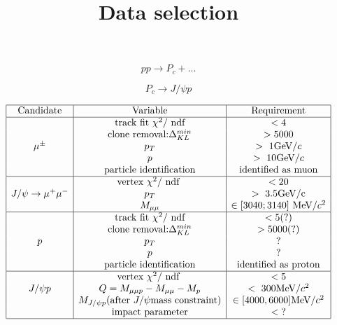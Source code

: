 \documentclass[11pt, oneside]{article}   	%
\title{Data selection}
\author{ }
\begin{document}
\maketitle
$$
pp\rightarrow P_c +...
$$

$$
P_c\rightarrow J/\psi p
$$



$$
\begin{array}{|c|c|c|}
\hline 

\text{Candidate} & \text{Variable} & \text{Requirement} \\

\hline

{} & {\text { track fit } \chi^{2} / \text { ndf }} & {<4} \\
{} & {\text{clone removal:} \Delta_{KL}^{min}} & {>5000} \\
{\mu^{\pm}} & p_T & >\text{ 1GeV}/c \\
{} & p & >\text{ 10GeV}/c \\
{} & {\text{particle identification}} & \text{identified as muon}\\

\hline

{} & {\text{vertex } \chi^{2}/\text { ndf }} & <\text{20}\\
J/\psi\space \rightarrow \mu^{+} \mu^{-} & {p_T} & >\text{ 3.5GeV/c}\\
{} & M_{\mu\mu} & \in[3040;3140] \text{ MeV}/c^2 \\

\hline

{} & {\text { track fit } \chi^{2} / \text { ndf }} & {<5(?)} \\
{} & {\text{clone removal:} \Delta_{KL}^{min}} & {>5000(?)} \\
{p} & p_T & \text{?} \\
{} & p & \text{?} \\
{} & {\text{particle identification}} & \text{identified as proton}\\

\hline

{} & {\text{vertex } \chi^{2}/\text { ndf }} & {<5}\\
J/\psi \space p & Q=M_{\mu\mu p}-M_{\mu\mu}-M_p & <\text{ 300MeV}/c^2 \\
{} & M_{J/\psi \space p}\text{(after } J/\psi \text{mass constraint)} & \in[4000,6000]\text{MeV}/c^2\\
{} & \text{impact parameter} &  <\text{?}\\
\hline




\end{array}
$$
\end{document}
